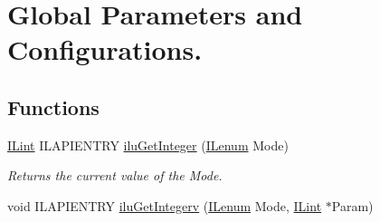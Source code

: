 \hypertarget{group__ilu__state}{\section{Global Parameters and Configurations.}
\label{group__ilu__state}
}
\subsection*{Functions}
\begin{DoxyCompactItemize}
\item 
\hyperlink{group__il__types_ga8effe51a00daaa0878631e5af75a36cb}{I\+Lint} I\+L\+A\+P\+I\+E\+N\+T\+R\+Y \hyperlink{group__ilu__state_gaecb69a456d72f9c6c449604217142710}{ilu\+Get\+Integer} (\hyperlink{group__il__types_ga62ca73445716183ef42b1f3906a45ed0}{I\+Lenum} Mode)
\begin{DoxyCompactList}\small\item\em Returns the current value of the {\itshape Mode}. \end{DoxyCompactList}\item 
\hypertarget{group__ilu__state_gad63d708dd1c58cc0c0ef857119879b6d}{void I\+L\+A\+P\+I\+E\+N\+T\+R\+Y \hyperlink{group__ilu__state_gad63d708dd1c58cc0c0ef857119879b6d}{ilu\+Get\+Integerv} (\hyperlink{group__il__types_ga62ca73445716183ef42b1f3906a45ed0}{I\+Lenum} Mode, \hyperlink{group__il__types_ga8effe51a00daaa0878631e5af75a36cb}{I\+Lint} $\ast$Param)}\label{group__ilu__state_gad63d708dd1c58cc0c0ef857119879b6d}


\end{DoxyCompactItemize}
